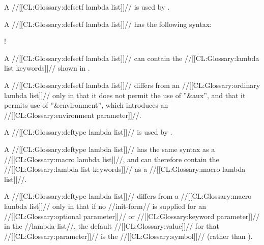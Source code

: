 \endsubsection%

 

A //[[CL:Glossary:defsetf lambda list]]// is used by .

A //[[CL:Glossary:defsetf lambda list]]// has the following syntax:

\Vskip 1pc! 

A //[[CL:Glossary:defsetf lambda list]]// can contain the //[[CL:Glossary:lambda list keywords]]// shown in \thenextfigure.


A //[[CL:Glossary:defsetf lambda list]]// differs from an //[[CL:Glossary:ordinary lambda list]]//  only in that it does not permit the use of ''&aux'',  and that it permits use of ''&environment'', 
     which introduces an //[[CL:Glossary:environment parameter]]//.

\endsubSection%

 

A //[[CL:Glossary:deftype lambda list]]// is used by .

A //[[CL:Glossary:deftype lambda list]]// has the same syntax as a //[[CL:Glossary:macro lambda list]]//, and can therefore contain the //[[CL:Glossary:lambda list keywords]]// as a //[[CL:Glossary:macro lambda list]]//.

  A //[[CL:Glossary:deftype lambda list]]// differs from a //[[CL:Glossary:macro lambda list]]//  only in that if no //init-form// is supplied for an //[[CL:Glossary:optional parameter]]// or //[[CL:Glossary:keyword parameter]]// in the //lambda-list//, the default //[[CL:Glossary:value]]//  for that //[[CL:Glossary:parameter]]// is the //[[CL:Glossary:symbol]]// \misc{*} (rather than \nil).

\endsubSection%

 


